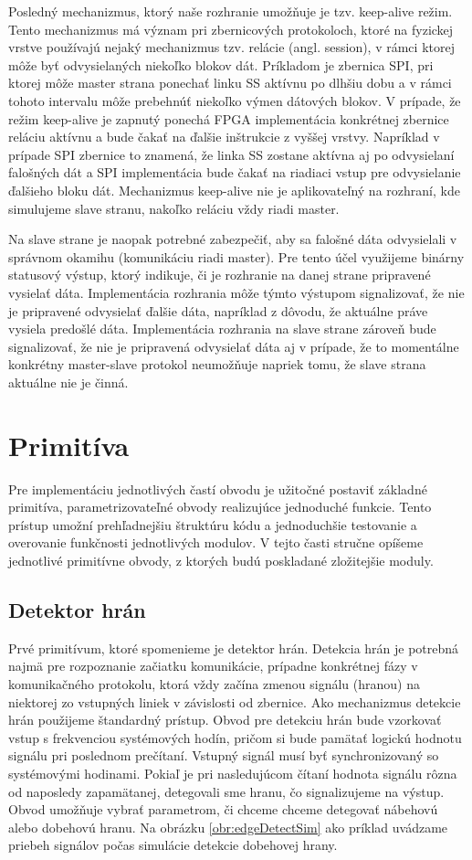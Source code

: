 Posledný mechanizmus, ktorý naše rozhranie umožňuje je tzv. keep-alive režim. Tento mechanizmus má význam pri zbernicových protokoloch, ktoré na fyzickej vrstve používajú nejaký mechanizmus tzv. relácie (angl. session), v rámci ktorej môže byť odvysielaných niekoľko blokov dát. Príkladom je zbernica SPI, pri ktorej môže master strana ponechať linku SS aktívnu po dlhšiu dobu a v rámci tohoto intervalu môže prebehnúť niekoľko výmen dátových blokov. V prípade, že režim keep-alive je zapnutý ponechá FPGA implementácia konkrétnej zbernice reláciu aktívnu a bude čakať na ďalšie inštrukcie z vyššej vrstvy. Napríklad v prípade SPI zbernice to znamená, že linka SS zostane aktívna aj po odvysielaní falošných dát a SPI implementácia bude čakať na riadiaci vstup pre odvysielanie ďalšieho bloku dát. Mechanizmus keep-alive nie je aplikovateľný na rozhraní, kde simulujeme slave stranu, nakoľko reláciu vždy riadi master.

Na slave strane je naopak potrebné zabezpečiť, aby sa falošné dáta odvysielali v správnom okamihu (komunikáciu riadi master). Pre tento účel využijeme binárny statusový výstup, ktorý indikuje, či je rozhranie na danej strane pripravené vysielať dáta. Implementácia rozhrania môže týmto výstupom signalizovať, že nie je pripravené odvysielať ďalšie dáta, napríklad z dôvodu, že aktuálne práve vysiela predošlé dáta. Implementácia rozhrania na slave strane zároveň bude signalizovať, že nie je pripravená odvysielať dáta aj v prípade, že to momentálne konkrétny master-slave protokol neumožňuje napriek tomu, že slave strana aktuálne nie je činná.

\section{Primitíva}
Pre implementáciu jednotlivých častí obvodu je užitočné postaviť základné primitíva, parametrizovateľné obvody realizujúce jednoduché funkcie. Tento prístup umožní prehľadnejšiu štruktúru kódu a jednoduchšie testovanie a overovanie funkčnosti jednotlivých modulov. V tejto časti stručne opíšeme jednotlivé primitívne obvody, z ktorých budú poskladané zložitejšie moduly.

\subsection{Detektor hrán} \label{subsek:edgeDetector}
Prvé primitívum, ktoré spomenieme je detektor hrán. Detekcia hrán je potrebná najmä pre rozpoznanie začiatku komunikácie, prípadne konkrétnej fázy v komunikačného protokolu, ktorá vždy začína zmenou signálu (hranou) na niektorej zo vstupných liniek v závislosti od zbernice. Ako mechanizmus detekcie hrán použijeme štandardný prístup. Obvod pre detekciu hrán bude vzorkovať vstup s frekvenciou systémových hodín, pričom si bude pamätať logickú hodnotu signálu pri poslednom prečítaní. Vstupný signál musí byť synchronizovaný so systémovými hodinami. Pokiaľ je pri nasledujúcom čítaní hodnota signálu rôzna od naposledy zapamätanej, detegovali sme hranu, čo signalizujeme na výstup. Obvod umožňuje vybrať parametrom, či chceme chceme detegovať nábehovú alebo dobehovú hranu. Na obrázku \ref{obr:edgeDetectSim} ako príklad uvádzame priebeh signálov počas simulácie detekcie dobehovej hrany.

